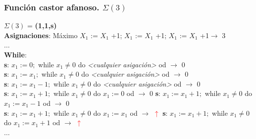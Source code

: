 \documentclass[xcolor=table]{beamer}
\begin{document}
\begin{frame}[fragile]\frametitle{Función castor afanoso.  $\Sigma(3)$} \scriptsize


        $\Sigma(3)$ = \textbf{(1,1,s)}\\

        \textbf{Asignaciones}: Máximo $X_1$ := $X_1$ +1;   $X_1$ := $X_1$ +1;  $X_1$ := $X_1$ +1$\rightarrow$ 3\\
        $\ldots$\\
        \textbf{While}:\\  
        \textbf{s}: $x_1 := 0;$  while $x_1 \neq 0$ do \textit{<cualquier asigación>} od $\rightarrow$ 0\\
        \textbf{s}: $x_1 := x_1;$  while $x_1 \neq 0$ do \textit{<cualquier asigación>} od $\rightarrow$ 0\\
        \textbf{s}: $x_1 := x_1-1;$  while $x_1 \neq 0$ do \textit{<cualquier asigación>} od $\rightarrow$ 0\\

        \textbf{s}: $x_1 := x_1+1;$  while $x_1 \neq 0$ do $x_1 := 0$ od $\rightarrow$ 0
        \hspace*{0.4cm} \textbf{s}: $x_1 := x_1+1;$  while $x_1 \neq 0$ do $x_1 := x_1 - 1$ od $\rightarrow$ 0\\
        \textbf{s}: $x_1 := x_1+1;$  while $x_1 \neq 0$ do $x_1 := x_1$ od $\rightarrow$ \textcolor{red}{$\uparrow$}
        \hspace*{0.3cm} \textbf{s}: $x_1 := x_1+1;$  while $x_1 \neq 0$ do $x_1 := x_1+1$ od $\rightarrow$ \textcolor{red}{$\uparrow$}\\

 $\ldots$\\

    
\end{frame}
\end{document}
